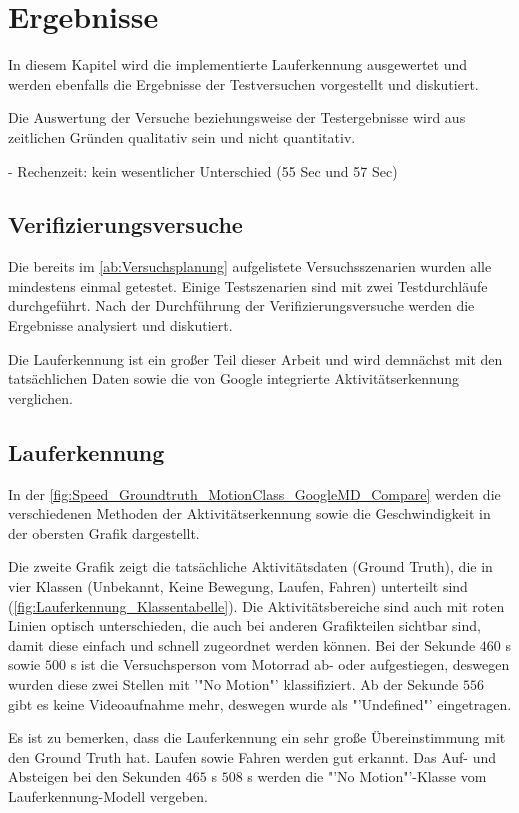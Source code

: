 \chapter{Ergebnisse}

In diesem Kapitel wird die implementierte Lauferkennung ausgewertet und werden ebenfalls die Ergebnisse der Testversuchen vorgestellt und diskutiert.

Die Auswertung der Versuche beziehungsweise der Testergebnisse wird aus zeitlichen Gründen qualitativ sein und nicht quantitativ.


- Rechenzeit: kein wesentlicher Unterschied (55 Sec und 57 Sec)

\section{Verifizierungsversuche}

Die bereits im \autoref{ab:Versuchsplanung} aufgelistete Versuchsszenarien wurden alle mindestens einmal getestet. Einige Testszenarien sind mit zwei Testdurchläufe durchgeführt.
Nach der Durchführung der Verifizierungsversuche werden die Ergebnisse analysiert und diskutiert. 

Die Lauferkennung ist ein großer Teil dieser Arbeit und wird demnächst mit den tatsächlichen Daten sowie die von Google integrierte Aktivitätserkennung verglichen.
\section{Lauferkennung}
In der \autoref{fig:Speed_Groundtruth_MotionClass_GoogleMD_Compare} werden die verschiedenen Methoden der Aktivitätserkennung sowie die Geschwindigkeit in der obersten Grafik dargestellt.

Die zweite Grafik zeigt die tatsächliche Aktivitätsdaten (Ground Truth), die in vier Klassen (Unbekannt, Keine Bewegung, Laufen, Fahren) unterteilt sind (\autoref{fig:Lauferkennung_Klassentabelle}). Die Aktivitätsbereiche sind auch mit roten Linien optisch unterschieden, die auch bei anderen Grafikteilen sichtbar sind, damit diese einfach und schnell zugeordnet werden können. Bei der Sekunde $460$ s sowie $500$ s ist die Versuchsperson vom Motorrad ab- oder aufgestiegen, deswegen wurden diese zwei Stellen mit '"No Motion"' klassifiziert. Ab der Sekunde $556$ gibt es keine Videoaufnahme mehr, deswegen wurde als "'Undefined"' eingetragen.

Es ist zu bemerken, dass die Lauferkennung ein sehr große Übereinstimmung mit den Ground Truth hat. Laufen sowie Fahren werden gut erkannt. Das Auf- und Absteigen bei den Sekunden $465$ s $508$ s werden die "'No Motion"'-Klasse vom Lauferkennung-Modell vergeben.

